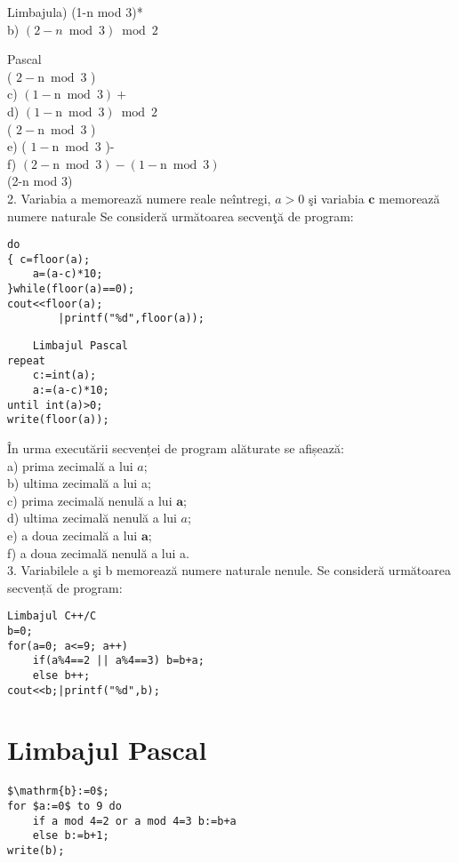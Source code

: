 Limbajula) (1-n mod 3)*\\
b) $(2-n \bmod 3) \bmod 2$

Pascal\\
( $2-\mathrm{n} \bmod 3$ )\\
c) $(1-\mathrm{n} \bmod 3)+$\\
d) $(1-\mathrm{n} \bmod 3) \bmod 2$\\
( $2-\mathrm{n} \bmod 3$ )\\
e) ( $1-\mathrm{n} \bmod 3$ )-\\
f) $(2-\mathrm{n} \bmod 3)-(1-\mathrm{n} \bmod 3)$\\
(2-n mod 3)\\
2. Variabia a memorează numere reale neîntregi, $a>0$ şi variabia $\mathbf{c}$ memorează numere naturale Se consideră următoarea secvenţă de program:

\begin{verbatim}
do
{ c=floor(a);
    a=(a-c)*10;
}while(floor(a)==0);
cout<<floor(a);
        |printf("%d",floor(a));
\end{verbatim}

\begin{verbatim}
    Limbajul Pascal
repeat
    c:=int(a);
    a:=(a-c)*10;
until int(a)>0;
write(floor(a));
\end{verbatim}

În urma executării secvenței de program alăturate se afișează:\\
a) prima zecimală a lui $a$;\\
b) ultima zecimală a lui a;\\
c) prima zecimală nenulă a lui $\mathbf{a}$;\\
d) ultima zecimală nenulă a lui $a$;\\
e) a doua zecimală a lui $\mathbf{a}$;\\
f) a doua zecimală nenulă a lui a.\\
3. Variabilele a şi b memorează numere naturale nenule. Se consideră următoarea secvență de program:

\begin{verbatim}
Limbajul C++/C
b=0;
for(a=0; a<=9; a++)
    if(a%4==2 || a%4==3) b=b+a;
    else b++;
cout<<b;|printf("%d",b);
\end{verbatim}

\section*{Limbajul Pascal}
\begin{verbatim}
$\mathrm{b}:=0$;
for $a:=0$ to 9 do
    if a mod 4=2 or a mod 4=3 b:=b+a
    else b:=b+1;
write(b);
\end{verbatim}


